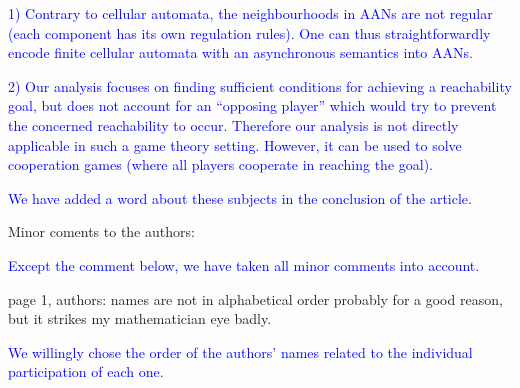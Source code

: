 \documentclass[11pt]{article}
\newcommand{\ilanswer}[1]{\textcolor{blue}{#1}}
\newcommand{\answer}[1]{\ilanswer{#1}\vspace*{1em}}
\begin{document}

\ilanswer{
1) Contrary to cellular automata, the neighbourhoods in AANs are not regular
(each component has its own regulation rules).
One can thus straightforwardly encode finite cellular automata
with an asynchronous semantics into AANs.
}

\ilanswer{
2) Our analysis focuses on finding sufficient conditions for achieving a
reachability goal, but does not account for an “opposing player” which would
try to prevent the concerned reachability to occur.
Therefore our analysis is not directly applicable in such a game theory setting.
However, it can be used to solve cooperation games
(where all players cooperate in reaching the goal).
}

\answer{
We have added a word about these subjects in the conclusion of the article.
}



Minor coments to the authors:

\answer{Except the comment below, we have taken all minor comments into account.}

page 1, authors: names are not in alphabetical order probably for a good reason, but it strikes my mathematician eye badly.

\answer{We willingly chose the order of the authors' names related to the individual participation of each one.}


\end{document}
